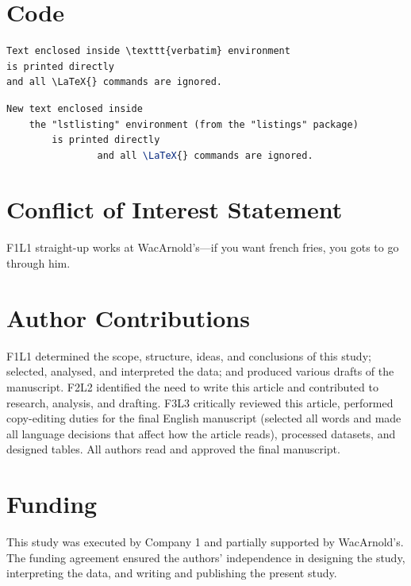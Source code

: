 \documentclass[utf8]{my_class_1_front_vanc}  %
\begin{document}
\section{Code}\label{code}

\begin{verbatim}
Text enclosed inside \texttt{verbatim} environment 
is printed directly 
and all \LaTeX{} commands are ignored.
\end{verbatim}

\newpage

\begin{lstlisting}[language=TeX]
New text enclosed inside 
    the "lstlisting" environment (from the "listings" package)
        is printed directly 
                and all \LaTeX{} commands are ignored.
\end{lstlisting}



\section*{Conflict of Interest Statement}

F1L1 straight-up works at WacArnold's---if you want french fries, you gots to go through him.

\section*{Author Contributions}

F1L1 determined the scope, structure, ideas, and conclusions of this study; selected, analysed, and
interpreted the data; and produced various drafts of the manuscript. F2L2 identified the need to
write this article and contributed to research, analysis, and drafting. F3L3 critically reviewed
this article, performed copy-editing duties for the final English manuscript (selected all words
and made all language decisions that affect how the article reads), processed datasets, and
designed tables. All authors read and approved the final manuscript.

\section*{Funding}

This study was executed by Company 1 and partially supported by WacArnold's. 
The funding agreement ensured the authors' independence in designing the study, interpreting the
data, and writing and publishing the present study.
\end{document}
